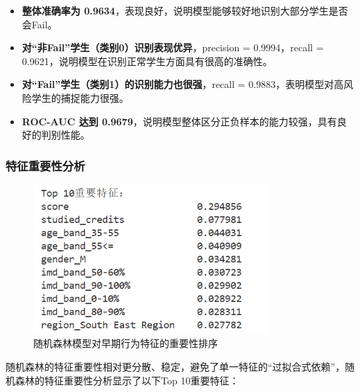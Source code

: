 \documentclass{SYSUReport}
\begin{document}
\begin{itemize}
\item \textbf{整体准确率为 0.9634}，表现良好，说明模型能够较好地识别大部分学生是否会Fail。
\item \textbf{对“非Fail”学生（类别0）识别表现优异}，precision = 0.9994，recall = 0.9621，说明模型在识别正常学生方面具有很高的准确性。
\item \textbf{对“Fail”学生（类别1）的识别能力也很强}，recall = 0.9883，表明模型对高风险学生的捕捉能力很强。
\item \textbf{ROC-AUC 达到 0.9679}，说明模型整体区分正负样本的能力较强，具有良好的判别性能。
\end{itemize}

\subsubsection{特征重要性分析}

\begin{figure}[htbp]
\centering
\includegraphics[width=0.8\textwidth]{figures/ensemble_method_feature_importance.png}
\caption{随机森林模型对早期行为特征的重要性排序}
\label{fig:ensemble_method_feature_importance}
\end{figure}

随机森林的特征重要性相对更分散、稳定，避免了单一特征的“过拟合式依赖”，随机森林的特征重要性分析显示了以下Top 10重要特征：
\end{document}
